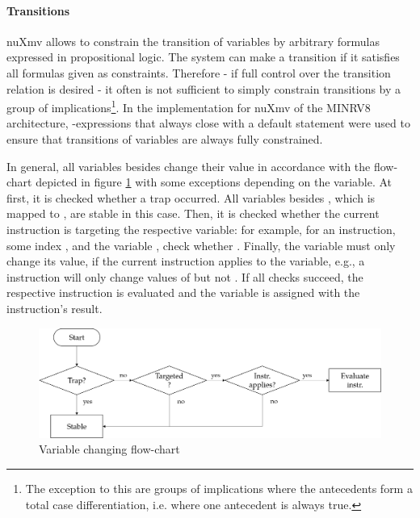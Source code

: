 \paragraph{Transitions}
nuXmv allows to constrain the transition of variables by arbitrary formulas expressed in propositional logic.
The system can make a transition if it satisfies all formulas given as constraints.
Therefore - if full control over the transition relation is desired - it often is not sufficient to simply constrain transitions by a group of implications\footnote{%
    The exception to this are groups of implications where the antecedents form a total case differentiation, i.e. where one antecedent is always true.
}.
In the implementation for nuXmv of the MINRV8 architecture, -expressions that always close with a default statement were used to ensure that transitions of variables are always fully constrained.

In general, all variables besides  change their value in accordance with the flow-chart depicted in figure \ref{fig:implementation-flow} with some exceptions depending on the variable.
At first, it is checked whether a trap occurred.
All variables besides , which is mapped to , are stable in this case.
Then, it is checked whether the current instruction is targeting the respective variable: for example, for an  instruction, some index , and the variable , check whether .
Finally, the variable must only change its value, if the current instruction applies to the variable, e.g., a  instruction will only change values of  but not .
If all checks succeed, the respective instruction is evaluated and the variable is assigned with the instruction's result.

\begin{figure}
    \centering
    \includegraphics[width=\textwidth]{figures/implementation-flow.png}
    \caption{Variable changing flow-chart}
    \label{fig:implementation-flow}
\end{figure}

